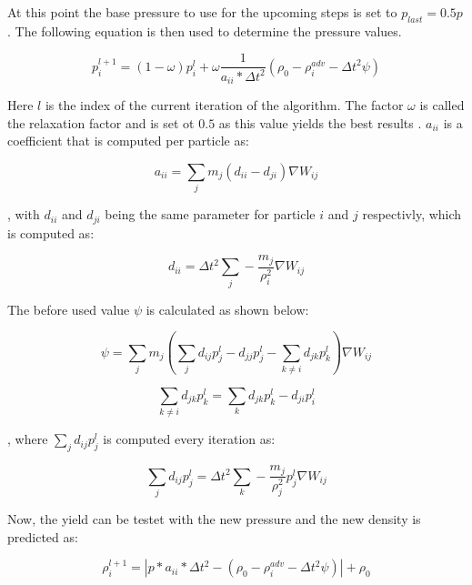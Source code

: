 \documentclass[intern]{cgMA}
\begin{document}
    At this point the base pressure to use for the upcoming steps is set to $p_{last} = 0.5p$ \cite{6570475}. The following equation is then used to determine the pressure values.

    \begin{equation}
        p_i^{l+1} = (1 - \omega) p_i^l + \omega \frac{1}{a_{ii} * \Delta t^2} (\rho_0 - \rho_i^{adv} - \Delta t^2 \psi)
    \end{equation}

    Here $l$ is the index of the current iteration of the algorithm. The factor $\omega$ is called the relaxation factor and is set ot $0.5$ as this value yields the best results \cite{6570475}. $a_{ii}$ is a coefficient that is computed per particle as: 

    \begin{equation}
        a_{ii} = \sum_j m_j (d_{ii} - d_{ji}) \nabla W_{ij}
    \end{equation}

    , with $d_{ii}$ and $d_{ji}$ being the same parameter for particle $i$ and $j$ respectivly, which is computed as:

    \begin{equation}
        d_{ii} = \Delta t^2 \sum_j -\frac{m_j}{\rho_i^2} \nabla W_{ij}
    \end{equation}

    The before used value $\psi$ is calculated as shown below:

    \begin{equation}
        \psi = \sum_j m_j (\sum_j d_{ij}p_j^l - d_{jj}p_j^l - \sum_{k \neq i} d_{jk}p_k^l) \nabla W_{ij}
    \end{equation}

    \begin{equation}
        \sum_{k \neq i} d_{jk}p_k^l = \sum_{k} d_{jk}p_k^l - d_{ji}p_i^l 
    \end{equation}

    , where $\sum_j d_{ij}p_j^l$ is computed every iteration as:

    \begin{equation}
        \sum_j d_{ij}p_j^l = \Delta t^2 \sum_{k} -\frac{m_j}{\rho_j^2} p_j^l \nabla W_{ij}
    \end{equation}

    Now, the yield can be testet with the new pressure and the new density is predicted as:

    \begin{equation}
        \rho_i^{l+1} = |p * a_{ii} * \Delta t^2 - (\rho_0 - \rho_i^{adv} - \Delta t^2 \psi)| + \rho_0
    \end{equation}
\end{document}
